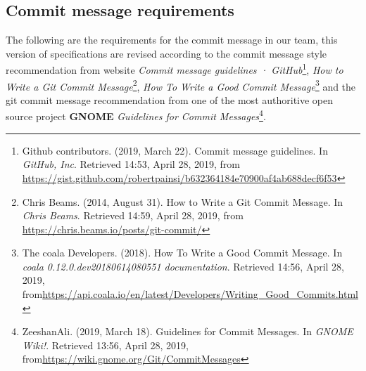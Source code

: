 \documentclass[a4paper]{report}
\begin{document}
\subsection{Commit message requirements}
The following are the requirements for the commit message in our team, this version of specifications are revised according to the commit message style recommendation from website \emph{Commit message guidelines · GitHub}\footnote{Github contributors. (2019, March 22). Commit message guidelines. In \emph{GitHub, Inc}. Retrieved 14:53, April 28, 2019, from \url{https://gist.github.com/robertpainsi/b632364184e70900af4ab688decf6f53}}, \emph{How to Write a Git Commit Message}\footnote{Chris Beams. (2014, August 31). How to Write a Git Commit Message. In \emph{Chris Beams}. Retrieved 14:59, April 28, 2019, from \url{https://chris.beams.io/posts/git-commit/}}, \emph{How To Write a Good Commit Message}\footnote{The coala Developers. (2018). How To Write a Good Commit Message. In \emph{coala 0.12.0.dev20180614080551 documentation}. Retrieved 14:56, April 28, 2019, from\url{https://api.coala.io/en/latest/Developers/Writing_Good_Commits.html}} and the git commit message recommendation from one of the most authoritive open source project \textbf{GNOME} \emph{Guidelines for Commit Messages}\footnote{ZeeshanAli. (2019, March 18). Guidelines for Commit Messages. In \emph{GNOME Wiki!}. Retrieved 13:56, April 28, 2019, from\url{https://wiki.gnome.org/Git/CommitMessages}}.
\end{document}
